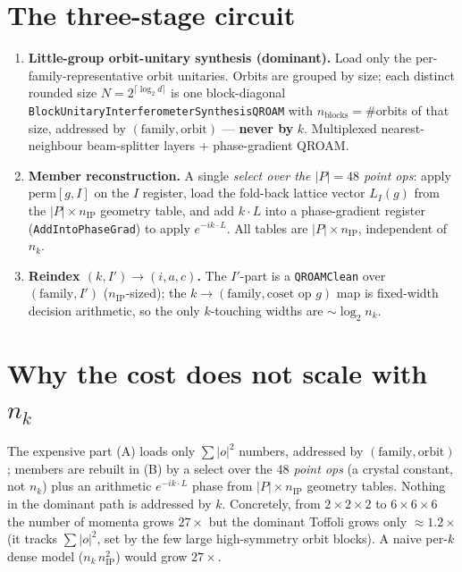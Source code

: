 \documentclass[11pt]{article}
\begin{document}
\section*{The three-stage circuit}

\begin{enumerate}[leftmargin=1.3em]
  \item[\textbf{(A)}] \textbf{Little-group orbit-unitary synthesis (dominant).} Load only the
  per-family-representative orbit unitaries. Orbits are grouped by size; each distinct rounded size
  $N=2^{\lceil\log_2 d\rceil}$ is one block-diagonal
  \texttt{BlockUnitaryInterferometerSynthesisQROAM} with $n_{\text{blocks}}=\#$orbits of that size,
  addressed by $(\text{family},\text{orbit})$ --- \textbf{never by }$k$. Multiplexed
  nearest-neighbour beam-splitter layers $+$ phase-gradient QROAM.
  \item[\textbf{(B)}] \textbf{Member reconstruction.} A single \emph{select over the $|P|\!=\!48$
  point ops}: apply $\mathrm{perm}[g,I]$ on the $I$ register, load the fold-back lattice vector
  $L_I(g)$ from the $|P|\times n_{\mathrm{IP}}$ geometry table, and add $k\!\cdot\!L$ into a
  phase-gradient register (\texttt{AddIntoPhaseGrad}) to apply $e^{-ik\cdot L}$. All tables are
  $|P|\times n_{\mathrm{IP}}$, independent of $n_k$.
  \item[\textbf{(C)}] \textbf{Reindex $(k,I')\to(i,a,c)$.} The $I'$-part is a \texttt{QROAMClean}
  over $(\text{family},I')$ ($n_{\mathrm{IP}}$-sized); the $k\to(\text{family},\text{coset op }g)$
  map is fixed-width decision arithmetic, so the only $k$-touching widths are $\sim\log_2 n_k$.
\end{enumerate}

\section*{Why the cost does not scale with $n_k$}

The expensive part (A) loads only $\sum|o|^2$ numbers, addressed by $(\text{family},\text{orbit})$;
members are rebuilt in (B) by a select over the \emph{$48$ point ops} (a crystal constant, not $n_k$)
plus an arithmetic $e^{-ik\cdot L}$ phase from $|P|\times n_{\mathrm{IP}}$ geometry tables. Nothing in
the dominant path is addressed by $k$. Concretely, from $2\times2\times2$ to $6\times6\times6$ the
number of momenta grows $27\times$ but the dominant Toffoli grows only $\approx1.2\times$ (it tracks
$\sum|o|^2$, set by the few large high-symmetry orbit blocks). A naive per-$k$ dense model
($n_k\,n_{\mathrm{IP}}^2$) would grow $27\times$.
\end{document}
